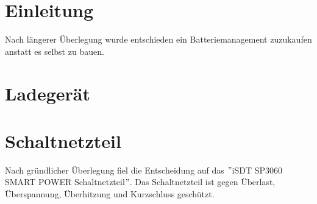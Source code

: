 \section{Einleitung}
Nach längerer Überlegung wurde entschieden ein Batteriemanagement zuzukaufen anstatt es selbst zu bauen.  

\section{Ladegerät}

\section{Schaltnetzteil}
Nach gründlicher Überlegung fiel die Entscheidung auf das $"$iSDT SP3060 SMART POWER Schaltnetzteil$"$.
Das Schaltnetzteil ist gegen Überlast, Überspannung, Überhitzung und Kurzschluss geschützt. 